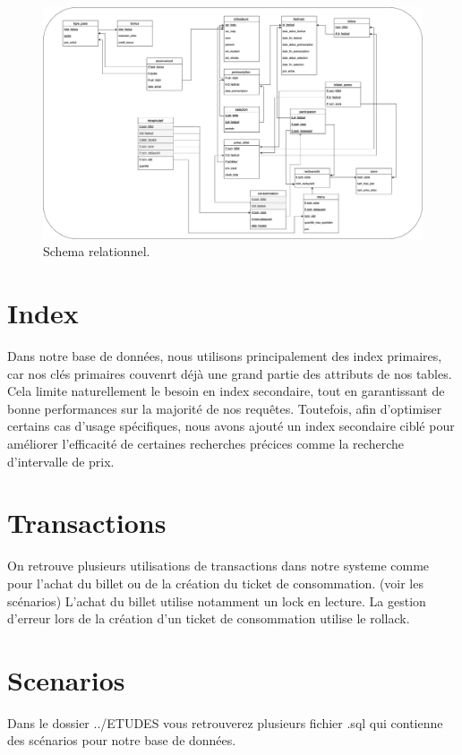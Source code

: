 \documentclass{article}
\begin{document}
\begin{figure}[h]
    \centering
    \includegraphics[width=1\textwidth]{schema_relationnel.png}
    \caption{Schema relationnel.}
    \label{fig:monimage}
\end{figure}

\section{Index}

Dans notre base de données, nous utilisons principalement des index primaires, 
car nos clés primaires couvenrt déjà une grand partie des attributs de nos tables.
Cela limite naturellement le besoin en index secondaire,
tout en garantissant de bonne performances sur la majorité de nos requêtes. 
Toutefois, afin d'optimiser certains cas d'usage spécifiques, 
nous avons ajouté un index secondaire ciblé pour améliorer l'efficacité de certaines recherches précices comme la recherche d'intervalle de prix.


\section{Transactions}
On retrouve plusieurs utilisations de transactions dans notre systeme comme pour l'achat du billet ou de la création du ticket de consommation. (voir les scénarios)
L'achat du billet utilise notamment un lock en lecture.
La gestion d'erreur lors de la création d'un ticket de consommation utilise le rollack.

\section{Scenarios}

Dans le dossier ../ETUDES vous retrouverez plusieurs fichier .sql qui contienne des scénarios pour notre base de données.
\end{document}
